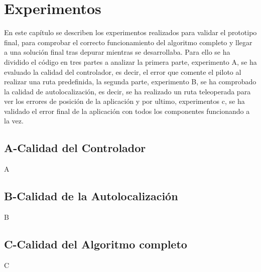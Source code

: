 \chapter{Experimentos}\label{cap.experimentos}
\hspace{1cm} En este capítulo se describen los experimentos realizados para validar el prototipo final, para comprobar el correcto funcionamiento del algoritmo completo y llegar a una solución final tras depurar mientras se desarrollaba. Para ello se ha dividido el código en tres partes a analizar la primera parte, experimento A, se ha evaluado la calidad del controlador, es decir, el error que comente el piloto al realizar una ruta predefinida, la segunda parte, experimento B, se ha comprobado la calidad de autolocalización, es decir, se ha realizado un ruta teleoperada para ver los errores de posición de la aplicación y por ultimo, experimentos c, se ha validado el error final de la aplicación con todos los componentes funcionando a la vez.

\section{A-Calidad del Controlador}
\hspace{1cm} A

\section{B-Calidad de la Autolocalización}
\hspace{1cm} B

\section{C-Calidad del Algoritmo completo}
\hspace{1cm} C
